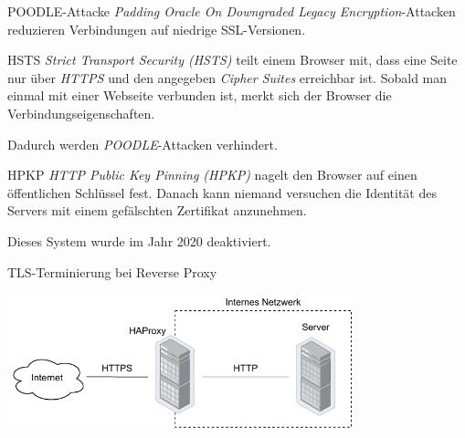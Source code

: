 \begin{bonus}{POODLE-Attacke}
    \emph{Padding Oracle On Downgraded Legacy Encryption}-Attacken reduzieren Verbindungen auf niedrige SSL-Versionen.
\end{bonus}

\begin{defi}{HSTS}
    \emph{Strict Transport Security (HSTS)} teilt einem Browser mit, dass eine Seite nur über \emph{HTTPS} und den angegeben \emph{Cipher Suites} erreichbar ist.
    Sobald man einmal mit einer Webseite verbunden ist, merkt sich der Browser die Verbindungseigenschaften.

    Dadurch werden \emph{POODLE}-Attacken verhindert.
\end{defi}

\begin{defi}{HPKP}
    \emph{HTTP Public Key Pinning (HPKP)} nagelt den Browser auf einen öffentlichen Schlüssel fest.
    Danach kann niemand versuchen die Identität des Servers mit einem gefälschten Zertifikat anzunehmen.

    Dieses System wurde im Jahr 2020 deaktiviert.
\end{defi}

\begin{bonus}{TLS-Terminierung bei Reverse Proxy}
    \begin{center}
        \includegraphics[width=0.75\textwidth]{includes/figures/bonus_tls_reverse_proxy.pdf}
    \end{center}
\end{bonus}